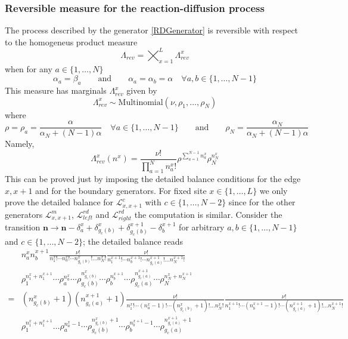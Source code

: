 \documentclass[10pt]{article}
\numberwithin{equation}{section}
\numberwithin{equation}{subsection}
\newcommand{\twoj}{\nu}
\begin{document}
\subsubsection{Reversible measure for the reaction-diffusion process} 
The process described by the generator \eqref{RDGenerator} is reversible with respect to the homogeneus product measure \begin{equation}\label{reversibleMeasureRD}
	\Lambda_{rev}=\bigtimes_{x=1}^{L}\Lambda_{rev}^{x}
\end{equation}
when for any $a\in\{1,\ldots,N\}$
\begin{equation}\label{reversibilityConditionRD}
	\alpha_{a}=\beta_{a}\qquad\text{and}\qquad \alpha_{a}=\alpha_{b}=\alpha \quad \forall a,b\in \{1,\ldots,N-1\}
\end{equation}
This measure has marginals $\Lambda_{rev}^{x}$ given by 
\begin{equation}
	\Lambda^{x}_{rev}\sim \text{Multinomial}\left(\twoj,\rho_{1},\ldots,\rho_{N}\right)
\end{equation}
where 
\begin{equation}
	\rho=\rho_{a}=\frac{\alpha}{\alpha_{N}+(N-1)\alpha}\quad \forall a\in \{1,\ldots,N-1\}\qquad \text{and}\qquad \rho_{N}=\frac{\alpha_{N}}{\alpha_{N}+(N-1)\alpha}
\end{equation}
Namely,
\begin{equation}
	\Lambda_{rev}^{x}(n^{x})=\frac{\nu!}{\prod_{a=1}^{N}n_{a}^{x}!}\rho^{\sum_{a=1}^{N-1}n_{a}^{x}}\rho_{N}^{n_{N}^{x}}
\end{equation}
This can be proved just by imposing the detailed balance conditions for the edge $x,x+1$ and for the boundary generators. For fixed site $x\in \{1,\ldots,L\}$ we only prove the detailed balance for  $\mathcal{L}_{x,x+1}^{c}$ with $c\in\{1,\ldots,N-2\}$ since for the other generators  $\mathcal{L}_{x,x+1}^{m}$, $\mathcal{L}_{left}^{rd}$ and $\mathcal{L}_{right}^{rd}$ the computation is similar. Consider the transition $\bm{n}\to \bm{n}-\delta_{a}^{x}+\delta_{g_{c}(b)}^{x}+\delta_{g_{c}(b)}^{x+1}-\delta_{b}^{x+1}$ for arbitrary $a,b\in\{1,\ldots,N-1\}$ and $c\in\{1,\ldots,N-2\}$; the detailed balance reads
\begin{equation}
	\begin{split}
		&n_{a}^{x}n_{b}^{x+1}\frac{\nu!}{n_{1}^{x}!\cdots n_{a}^{x}!\cdots n_{g_{c}(b)}^{x}!\ldots n_{N}^{x}!}\frac{\nu!}{n_{1}^{x+1}!\cdots n_{b}^{x+1}!\cdots n_{g_{c}(a)}^{x+1}!\ldots n_{N}^{x+1}!}\\&\rho_{1}^{n_{1}^{x}+n_{1}^{x+1}}\cdots \rho_{a}^{n_{a}^{x}}\cdots\rho_{g_{c}(b)}^{n_{g_{c}(b)}^{x}}\cdots\rho_{b}^{n_{b}^{x+1}}\cdots \rho_{g_{c}(a)}^{n_{g_{c}(a)}^{x+1}}\cdots \rho_{N}^{n_{N}^{x}+n_{N}^{x+1}}
		\\
		=&(n_{g_{c}(b)}^{x}+1)(n_{g_{c}(a)}^{x+1}+1)\frac{\nu!}{n_{1}^{x}!\cdots (n_{a}^{x}-1)!\cdots (n_{g_{c}(b)}^{x}+1)!\ldots n_{N}^{x}!}\frac{\nu!}{n_{1}^{x+1}!\cdots (n_{b}^{x+1}-1)!\cdots (n_{g_{c}(a)}^{x+1}+1)!\ldots n_{N}^{x+1}!}
		\\&
		\rho_{1}^{n_{1}^{x}+n_{1}^{x+1}}\ldots \rho_{a}^{n_{a}^{x}-1}\cdots\rho_{g_{c}(b)}^{n_{g_{c}(b)}^{x}+1}\cdots\rho_{b}^{n_{b}^{x+1}-1}\cdots \rho_{g_{c}(a)}^{n_{g_{c}(a)}^{x+1}+1}
	\end{split}
\end{equation}
\end{document}
